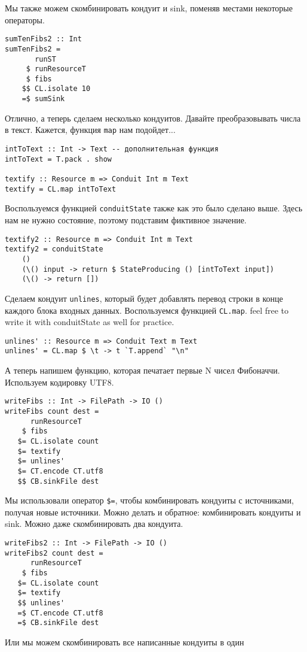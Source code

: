 Мы также можем скомбинировать кондуит и sink, поменяв местами некоторые операторы.
\begin{lstlisting}
sumTenFibs2 :: Int
sumTenFibs2 =
       runST
     $ runResourceT
     $ fibs
    $$ CL.isolate 10
    =$ sumSink
\end{lstlisting}
Отлично, а теперь сделаем несколько кондуитов. Давайте преобразовывать числа в текст.
Кажется, функция \lstinline=map= нам подойдет...
\begin{lstlisting}
intToText :: Int -> Text -- дополнительная функция 
intToText = T.pack . show

textify :: Resource m => Conduit Int m Text
textify = CL.map intToText
\end{lstlisting}
Воспользуемся функцией \lstinline=conduitState= также как это было сделано выше. Здесь
нам не нужно
состояние, поэтому подставим фиктивное значение.
\begin{lstlisting}
textify2 :: Resource m => Conduit Int m Text
textify2 = conduitState
    ()
    (\() input -> return $ StateProducing () [intToText input])
    (\() -> return [])
\end{lstlisting}
Сделаем кондуит \lstinline=unlines=, который будет добавлять перевод строки в конце каждого блока
входных данных. Воспользуемся функцией \lstinline=CL.map=. feel free to write it with
conduitState as
well for practice. 
\begin{lstlisting}
unlines' :: Resource m => Conduit Text m Text
unlines' = CL.map $ \t -> t `T.append` "\n"
\end{lstlisting}
А теперь напишем функцию, которая печатает первые N чисел Фибоначчи. Используем
кодировку UTF8.
\begin{lstlisting}
writeFibs :: Int -> FilePath -> IO ()
writeFibs count dest =
      runResourceT
    $ fibs
   $= CL.isolate count
   $= textify
   $= unlines'
   $= CT.encode CT.utf8
   $$ CB.sinkFile dest
\end{lstlisting}
Мы использовали оператор \lstinline'$=', чтобы комбинировать кондуиты с источниками,
получая
новые источники. Можно делать и обратное: комбинировать кондуиты и sink. Можно даже
скомбинировать два кондуита.
\begin{lstlisting}
writeFibs2 :: Int -> FilePath -> IO ()
writeFibs2 count dest =
      runResourceT
    $ fibs
   $= CL.isolate count
   $= textify
   $$ unlines'
   =$ CT.encode CT.utf8
   =$ CB.sinkFile dest
\end{lstlisting}
Или мы можем скомбинировать все написанные кондуиты в один
